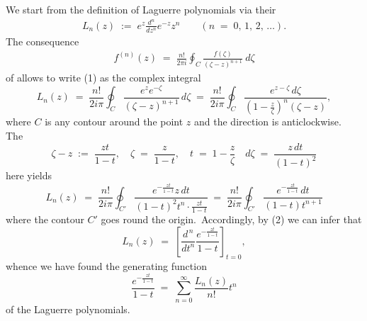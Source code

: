 \documentclass[12pt]{article}
\theoremstyle{definition}
\begin{document}
We start from the definition of Laguerre polynomials via their 
\begin{align}
L_n(z) \;:=\; e^z\frac{d^n}{dz^n}e^{-z}z^n \qquad (n \;=\; 0,\,1,\,2,\,\ldots).
\end{align}
The consequence 
\begin{align}
f^{(n)}(z) \;=\; \frac{n!}{2 \pi i} \oint_C \frac{f(\zeta)}{(\zeta-z)^{n+1}}\ d\zeta
\end{align}
of  allows to write (1) as the complex integral
$$L_n(z) \;=\; \frac{n!}{2i\pi}\oint_C\frac{e^ze^{-\zeta}}{(\zeta\!-\!z)^{n+1}}\,d\zeta
 \;=\; \frac{n!}{2i\pi}\oint_C\frac{e^{z-\zeta}\,d\zeta}{(1\!-\!\frac{z}{\zeta})^n(\zeta\!-\!z)},$$
where $C$ is any  contour around the point $z$ and the direction is anticlockwise.\, The 
$$\zeta\!-\!z \;:=\; \frac{zt}{1\!-\!t}, \quad \zeta \;=\; \frac{z}{1\!-\!t}, 
\quad t \;=\; 1\!-\!\frac{z}{\zeta} \quad d\zeta \;=\; \frac{z\,dt}{(1\!-\!t)^2}$$
here yields
$$L_n(z) \;=\; \frac{n!}{2i\pi}\oint_{C'}\frac{e^{-\frac{zt}{1-t}}z\,dt}{(1\!-\!t)^2t^n\cdot\frac{zt}{1-t}}
\;=\; \frac{n!}{2i\pi}\oint_{C'}\frac{e^{-\frac{zt}{1-t}}\,dt}{(1\!-\!t)t^{n+1}}$$
where the contour $C'$ goes round the origin.\, Accordingly, by (2) we can infer that
$$L_n(z) \;=\; \left[\frac{d^{\,n}}{dt^n}\frac{e^{-\frac{zt}{1-t}}}{1\!-\!t}\right]_{t=0},$$
whence we have found the generating function
$$\frac{e^{-\frac{zt}{1-t}}}{1\!-\!t} \;=\; \sum_{n=0}^\infty\frac{L_n(z)}{n!}t^n$$
of the Laguerre polynomials.

\end{document}
